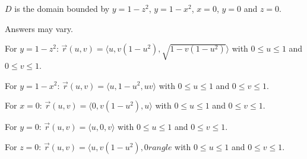 {$D$ is the domain bounded by $y=1-z^2$, $y=1-x^2$, $x=0$, $y=0$ and $z=0$.

{\hfill{}\hfill}
}
{Answers may vary. 

For $y=1-z^2$: $\vec r(u,v) = \langle u, v(1-u^2), \sqrt{1-v(1-u^2)}\rangle$ with $0\leq u\leq 1$ and $0\leq v\leq 1$.

For $y=1-x^2$: $\vec r(u,v) = \langle u, 1-u^2, uv\rangle$ with $0\leq u\leq 1$ and $0\leq v\leq 1$.

For $x=0$: $\vec r(u,v) = \langle 0, v(1-u^2),u\rangle$ with $0\leq u\leq 1$ and $0\leq v\leq 1$.

For $y=0$: $\vec r(u,v) = \langle u, 0,v\rangle$ with $0\leq u\leq 1$ and $0\leq v\leq 1$.

For $z=0$: $\vec r(u,v) = \langle u, v(1-u^2), 0rangle$ with $0\leq u\leq 1$ and $0\leq v\leq 1$.

}
